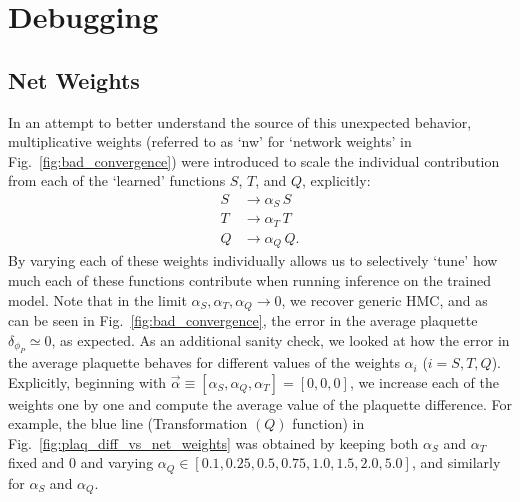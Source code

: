 \section{Debugging}%
\label{sec:debugging}%
\subsection{Net Weights}
\label{subsec:net_weights}
%
In an attempt to better understand the source of this unexpected behavior,
multiplicative weights (referred to as `nw' for `network weights' in
Fig.~\ref{fig:bad_convergence}) were introduced to scale the individual
contribution from each of the `learned' functions $S$, $T$, and $Q$,
explicitly:
%
\begin{align}
  S &\rightarrow \alpha_{S}\, S \\
  T &\rightarrow \alpha_{T}\, T \\
  Q &\rightarrow \alpha_{Q}\, Q.
\end{align}
%
By varying each of these weights individually allows us to selectively `tune'
how much each of these functions contribute when running inference on the
trained model.
%
Note that in the limit $\alpha_{S}, \alpha_{T}, \alpha_{Q} \rightarrow 0$, we
recover generic HMC, and as can be seen in Fig.~\ref{fig:bad_convergence},
the error in the average plaquette $\delta_{\phi_{P}} \simeq 0$, as expected.
%
As an additional sanity check, we looked at how the error in the average
plaquette behaves for different values of the weights $\alpha_{i}$ ($i = S, T,
Q$).
%
Explicitly, beginning with $\vec{\alpha} \equiv [\alpha_{S}, \alpha_{Q},
\alpha_{T}] = [0, 0, 0]$, we increase each of the weights one by one and compute
the average value of the plaquette difference.
%
For example, the blue line (Transformation $(Q)$ function) in
Fig.~\ref{fig:plaq_diff_vs_net_weights} was obtained by keeping both
$\alpha_{S}$ and $\alpha_{T}$ fixed and $0$ and varying $\alpha_{Q} \in
[0.1, 0.25, 0.5, 0.75, 1.0, 1.5, 2.0, 5.0]$, and similarly for $\alpha_{S}$ and
$\alpha_{Q}$.
%
